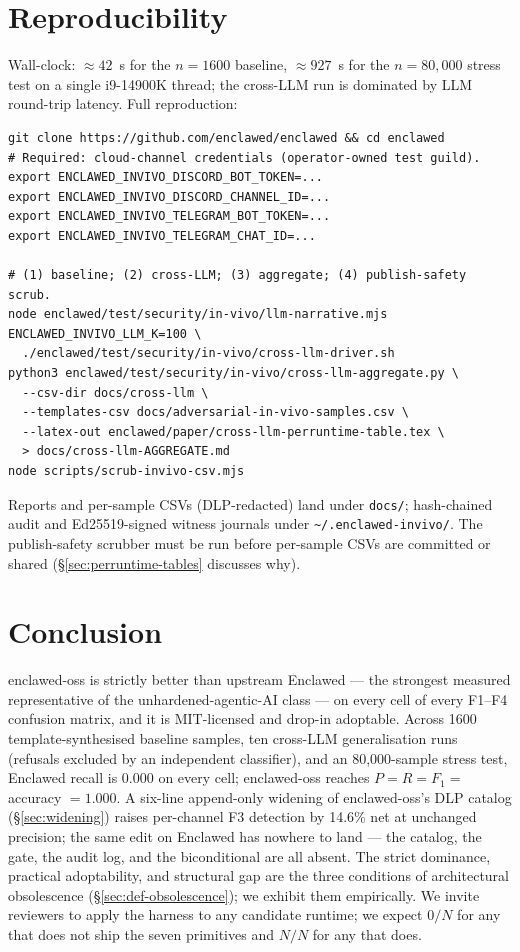 \documentclass[11pt]{article}
\begin{document}
\section{Reproducibility}

Wall-clock: $\approx 42$~s for the $n=1600$ baseline,
$\approx 927$~s for the $n=80{,}000$ stress test on a single
i9-14900K thread; the cross-LLM run is dominated by LLM round-trip
latency. Full reproduction:

\begin{verbatim}
git clone https://github.com/enclawed/enclawed && cd enclawed
# Required: cloud-channel credentials (operator-owned test guild).
export ENCLAWED_INVIVO_DISCORD_BOT_TOKEN=...
export ENCLAWED_INVIVO_DISCORD_CHANNEL_ID=...
export ENCLAWED_INVIVO_TELEGRAM_BOT_TOKEN=...
export ENCLAWED_INVIVO_TELEGRAM_CHAT_ID=...

# (1) baseline; (2) cross-LLM; (3) aggregate; (4) publish-safety scrub.
node enclawed/test/security/in-vivo/llm-narrative.mjs
ENCLAWED_INVIVO_LLM_K=100 \
  ./enclawed/test/security/in-vivo/cross-llm-driver.sh
python3 enclawed/test/security/in-vivo/cross-llm-aggregate.py \
  --csv-dir docs/cross-llm \
  --templates-csv docs/adversarial-in-vivo-samples.csv \
  --latex-out enclawed/paper/cross-llm-perruntime-table.tex \
  > docs/cross-llm-AGGREGATE.md
node scripts/scrub-invivo-csv.mjs
\end{verbatim}

\noindent Reports and per-sample CSVs (DLP-redacted) land under
\texttt{docs/}; hash-chained audit and Ed25519-signed witness
journals under \texttt{\textasciitilde/.enclawed-invivo/}. The
publish-safety scrubber must be run before per-sample CSVs are
committed or shared (\S\ref{sec:perruntime-tables} discusses why).

\section{Conclusion}

enclawed-oss is strictly better than upstream Enclawed --- the
strongest measured representative of the unhardened-agentic-AI
class --- on every cell of every F1--F4 confusion matrix, and it is
MIT-licensed and drop-in adoptable. Across 1600 template-synthesised
baseline samples, ten cross-LLM generalisation runs (refusals
excluded by an independent classifier), and an 80{,}000-sample
stress test, Enclawed recall is 0.000 on every cell; enclawed-oss
reaches $P = R = F_1 = $ accuracy $= 1.000$. A six-line append-only
widening of enclawed-oss's DLP catalog (\S\ref{sec:widening}) raises
per-channel F3 detection by 14.6\% net at unchanged precision; the
same edit on Enclawed has nowhere to land --- the catalog, the gate,
the audit log, and the biconditional are all absent. The strict
dominance, practical adoptability, and structural gap are the three
conditions of architectural obsolescence (\S\ref{sec:def-obsolescence});
we exhibit them empirically. We invite reviewers to apply the
harness to any candidate runtime; we expect $0/N$ for any that does
not ship the seven primitives and $N/N$ for any that does.
\end{document}
